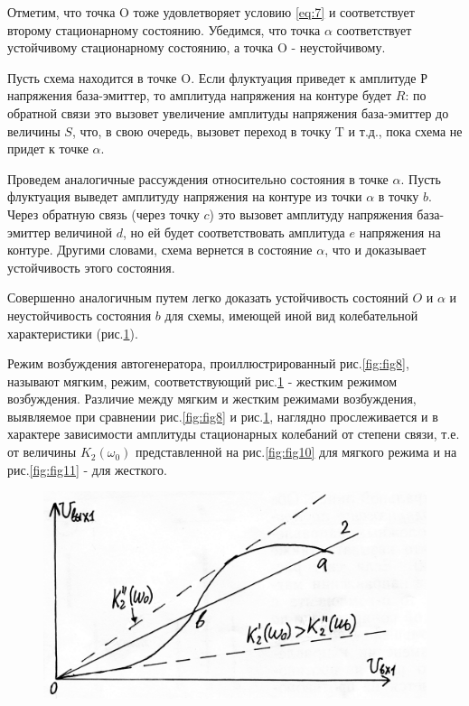 Отметим, что точка $\text{O}$ тоже удовлетворяет условию \eqref{eq:7} и соответствует второму стационарному состоянию. Убедимся, что точка $\alpha$ соответствует устойчивому стационарному состоянию, а точка $\text{O}$ - неустойчивому.

Пусть схема находится в точке $\text{O}$. Если флуктуация приведет к амплитуде $\text{Р}$ напряжения база-эмиттер, то амплитуда напряжения на контуре будет $R$: по обратной связи это вызовет увеличение амплитуды напряжения база-эмиттер до величины $S$, что, в свою очередь, вызовет переход в точку $\text{T}$ и т.д., пока схема не придет к точке $\alpha$.

Проведем аналогичные рассуждения относительно состояния в точке $\alpha$. Пусть флуктуация выведет амплитуду напряжения на контуре из точки $\alpha$ в точку $b$. Через обратную связь (через точку $c$) это вызовет амплитуду напряжения база-эмиттер величиной $d$, но ей будет соответствовать амплитуда $e$ напряжения на контуре. Другими словами, схема вернется в состояние $\alpha$, что и доказывает устойчивость этого состояния.

Совершенно аналогичным путем легко доказать устойчивость состояний $O$ и $\alpha$ и неустойчивость состояния $b$ для схемы, имеющей иной вид колебательной характеристики (рис.\ref{fig:fig9}).

Режим возбуждения автогенератора, проиллюстрированный рис.\ref{fig:fig8}, называют мягким, режим, соответствующий рис.\ref{fig:fig9} - жестким режимом возбуждения. Различие между мягким и жестким режимами возбуждения, выявляемое при сравнении рис.\ref{fig:fig8} и рис.\ref{fig:fig9}, наглядно прослеживается и в характере зависимости амплитуды стационарных колебаний от степени связи, т.е. от величины $K_2(\omega_0)$ представленной на рис.\ref{fig:fig10} для мягкого режима и на рис.\ref{fig:fig11} - для жесткого.

\begin{figure}[h]
	\centering
	\includegraphics[width=0.6\linewidth]{circuit/fig9}
	\caption{}
	\label{fig:fig9}
\end{figure}

